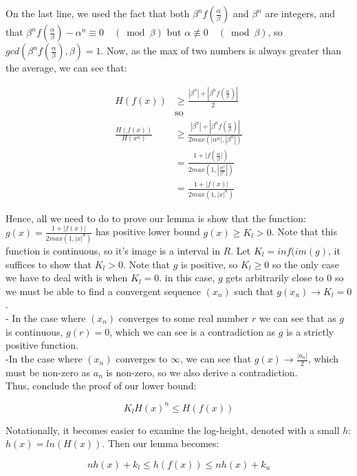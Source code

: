 \documentclass{article}
\begin{document}
On the last line, we used the fact that both $\beta^n f(\frac{\alpha}{\beta})$ and $\beta^n$ are integers, and that $\beta^n f(\frac{\alpha}{\beta}) - \alpha^n \equiv 0 \quad (\bmod{\beta})$ but $\alpha \not\equiv 0 \quad (\bmod{\beta})$, so $gcd(\beta^n f(\frac{\alpha}{\beta}), \beta) = 1$. Now, as the max of two numbers is always greater than the average, we can see that:

\begin{align*}
    H(f(x)) & \geq \frac{|\beta^n| + |\beta^n f(\frac{\alpha}{\beta})|}{2}\\
    &\text{so}\\
    \frac{H(f(x))}{H(x^n)} &\geq \frac{|\beta^n| + |\beta^n f(\frac{\alpha}{\beta})|}{2 max(|\alpha^n|,|\beta^n|)}\\
                        &= \frac{1 + |f(\frac{\alpha}{\beta}|)}{2 max(1, |\frac{\alpha^n}{\beta^n}|)}\\
                        &= \frac{1 + |f(x)|}{2 max(1, |x|^n)}
\end{align*}

Hence, all we need to do to prove our lemma is show that the function: $g(x) = \frac{1 + |f(x)|}{2 max(1, |x|^n)}$ has positive lower bound $g(x) \geq K_l > 0$. Note that this function is continuous, so it's image is a interval in $R$. Let $K_l = inf(im(g)$, it suffices to show that $K_l > 0$. Note that $g$ is positive, so $K_l \geq 0$ so the only case we have to deal with is when $K_l = 0$. in this case, $g$ gets arbitrarily close to $0$ so we must be able to find a convergent sequence $(x_n)$ such that $g(x_n) \rightarrow K_l = 0$. \\

- In the case where $(x_n)$ converges to some real number $r$ we can see that as $g$ is continuous, $g(r) = 0$, which we can see is a contradiction as $g$ is a strictly positive function.\\

-In the case where $(x_n)$ converges to $\infty$, we can see that $g(x) \rightarrow \frac{|a_n|}{2}$, which must be non-zero as $a_n$ is non-zero, so we also derive a contradiction.\\

Thus, conclude the proof of our lower bound:

\[ K_l H(x)^n \leq H(f(x)) \]

Notationally, it becomes easier to examine the log-height, denoted with a small $h$: $h(x) = ln(H(x))$. Then our lemma becomes:

\[ n h(x) + k_l \leq h(f(x)) \leq n h(x) + k_u \]
\end{document}
